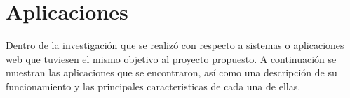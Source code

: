 

\section{Aplicaciones}
\noindent Dentro de la investigación que se realizó con respecto a sistemas o aplicaciones web que tuviesen el mismo objetivo al proyecto propuesto. A continuación se muestran las aplicaciones que se encontraron, así como una descripción de su funcionamiento y las principales caracteristicas de cada una de ellas.
